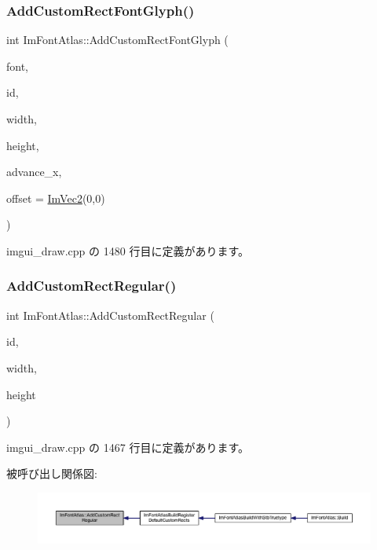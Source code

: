 \subsubsection{\texorpdfstring{Add\+Custom\+Rect\+Font\+Glyph()}{AddCustomRectFontGlyph()}}
{\footnotesize\ttfamily int Im\+Font\+Atlas\+::\+Add\+Custom\+Rect\+Font\+Glyph (\begin{DoxyParamCaption}\item[{\mbox{\hyperlink{struct_im_font}{Im\+Font}} $\ast$}]{font,  }\item[{\mbox{\hyperlink{imgui_8h_af2c7badaf05a0008e15ef76d40875e97}{Im\+Wchar}}}]{id,  }\item[{int}]{width,  }\item[{int}]{height,  }\item[{float}]{advance\+\_\+x,  }\item[{const \mbox{\hyperlink{struct_im_vec2}{Im\+Vec2}} \&}]{offset = {\ttfamily \mbox{\hyperlink{struct_im_vec2}{Im\+Vec2}}(0,0)} }\end{DoxyParamCaption})}



 imgui\+\_\+draw.\+cpp の 1480 行目に定義があります。

\mbox{\label{struct_im_font_atlas_ac51952803d2205f28ca9fc996c5f6243}} 
\subsubsection{\texorpdfstring{Add\+Custom\+Rect\+Regular()}{AddCustomRectRegular()}}
{\footnotesize\ttfamily int Im\+Font\+Atlas\+::\+Add\+Custom\+Rect\+Regular (\begin{DoxyParamCaption}\item[{unsigned int}]{id,  }\item[{int}]{width,  }\item[{int}]{height }\end{DoxyParamCaption})}



 imgui\+\_\+draw.\+cpp の 1467 行目に定義があります。

被呼び出し関係図\+:\nopagebreak
\begin{figure}[H]
\begin{center}
\leavevmode
\includegraphics[width=350pt]{struct_im_font_atlas_ac51952803d2205f28ca9fc996c5f6243_icgraph}
\end{center}
\end{figure}
\mbox{\label{struct_im_font_atlas_ad01c0f19a95d37a9e5ebab1e54525625}} 
